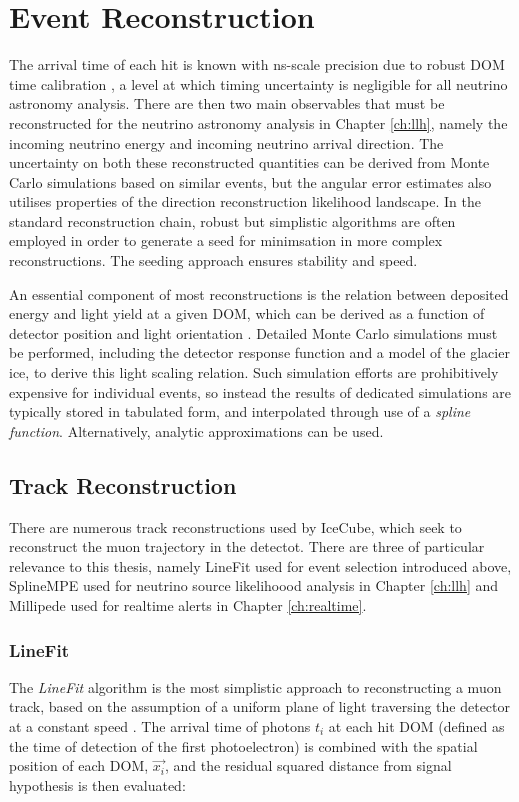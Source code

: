 \section{Event Reconstruction}
\label{sec:reco}

The arrival time of each hit is known with ns-scale precision due to robust DOM time calibration \cite{icecube_detector_17}, a level at which timing uncertainty is negligible for all neutrino astronomy analysis. There are then two main observables that must be reconstructed for the neutrino astronomy analysis in Chapter \ref{ch:llh}, namely the incoming neutrino energy and incoming neutrino arrival direction. The uncertainty on both these reconstructed quantities can be derived from Monte Carlo simulations based on similar events, but the angular error estimates also utilises properties of the direction reconstruction likelihood landscape. In the standard reconstruction chain, robust but simplistic algorithms are often employed in order to generate a seed for minimsation in more complex reconstructions. The seeding approach ensures stability and speed. 

An essential component of most reconstructions is the relation between deposited energy and light yield at a given DOM, which can be derived as a function of detector position and light orientation \cite{ic_energy_reco_14}. Detailed Monte Carlo simulations must be performed, including the detector response function and a model of the glacier ice, to derive this light scaling relation. Such simulation efforts are prohibitively expensive for individual events, so instead the results of dedicated simulations are typically stored in tabulated form, and interpolated through use of a \emph{spline function}. Alternatively, analytic approximations can be used.

\subsection*{Track Reconstruction}

There are numerous track reconstructions used by IceCube, which seek to reconstruct the muon trajectory in the detectot. There are three of particular relevance to this thesis, namely LineFit used for event selection introduced above, SplineMPE used for neutrino source likelihoood analysis in Chapter \ref{ch:llh} and Millipede used for realtime alerts in Chapter \ref{ch:realtime}. 

\subsubsection*{LineFit}
The \emph{LineFit} algorithm is the most simplistic approach to reconstructing a muon track, based on the assumption of a uniform plane of light traversing the detector at a constant speed . The arrival time of photons $t_{i}$ at each hit DOM (defined as the time of detection of the first photoelectron) is combined with the spatial position of each DOM, $\vec{x_{i}}$, and the residual squared distance from signal hypothesis is then evaluated:

